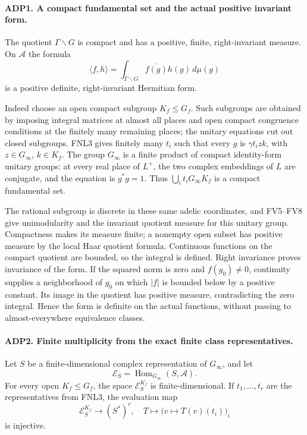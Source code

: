 \documentclass[11pt,a4paper]{article}
\numberwithin{equation}{section}
\theoremstyle{remark}\newtheorem{remark}[theorem]{Remark}
\begin{document}
\paragraph{ADP1. A compact fundamental set and the actual positive invariant form.}
\label{claim:ADP1}
The quotient \(\Gamma\backslash G\) is compact and has a positive,
finite, right-invariant measure.  On \(\mathcal A\) the formula
\[
       \langle f,h\rangle
       =\int_{\Gamma\backslash G}\overline{f(g)}h(g)\,d\mu(g)
\]
is a positive definite, right-invariant Hermitian form.

Indeed choose an open compact subgroup \(K_f\le G_f\).  Such subgroups
are obtained by imposing integral matrices at almost all places and open
compact congruence conditions at the finitely many remaining places; the
unitary equations cut out closed subgroups.  FNL3 gives finitely many
\(t_i\) such that every \(g\) is \(\gamma t_i z k\), with
\(z\in G_\infty\), \(k\in K_f\).  The group \(G_\infty\) is a
finite product of compact identity-form unitary groups: at every real
place of \(L^+\), the two complex embeddings of \(L\) are conjugate,
and the equation is \(g^*g=1\).  Thus
\(\bigcup_it_iG_\infty K_f\) is a compact fundamental set.

The rational subgroup is discrete in these same adelic coordinates,
and FV5--FV8 give unimodularity and the invariant quotient measure for
this unitary group.  Compactness makes its measure finite; a nonempty
open subset has positive measure by the local Haar quotient formula.
Continuous functions on the compact quotient are bounded, so the
integral is defined.  Right invariance proves invariance of the form.
If the squared norm is zero and \(f(g_0)\ne0\), continuity supplies
a neighborhood of \(g_0\) on which \(|f|\) is bounded below by a
positive constant.  Its image in the quotient has positive measure,
contradicting the zero integral.  Hence the form is definite on the
actual functions, without passing to almost-everywhere equivalence classes.

\paragraph{ADP2. Finite multiplicity from the exact finite class representatives.}
\label{claim:ADP2}
Let \(S\) be a finite-dimensional complex representation of
\(G_\infty\), and let
\[
 \mathcal E_S=\operatorname{Hom}_{G_\infty}(S,\mathcal A).
\]
For every open \(K_f\le G_f\), the space \(\mathcal E_S^{K_f}\)
is finite-dimensional.  If \(t_1,\ldots,t_r\) are the representatives
from FNL3, the evaluation map
\[
 \mathcal E_S^{K_f}\longrightarrow (S^*)^r,
       \quad T\longmapsto\bigl(v\mapsto T(v)(t_i)\bigr)_i
\]
is injective.
\end{document}
